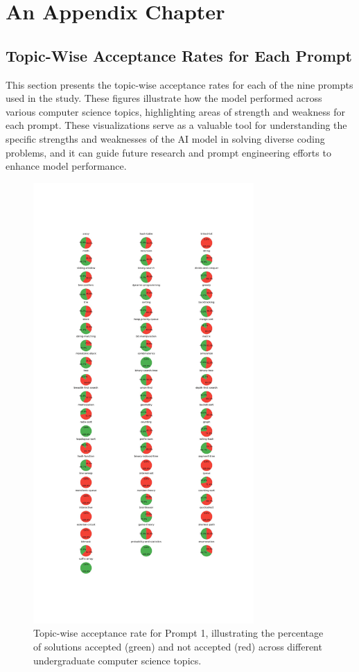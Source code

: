 \chapter{An Appendix Chapter}
\label{appn:A}

\section{Topic-Wise Acceptance Rates for Each Prompt}
This section presents the topic-wise acceptance rates for each of the nine prompts used in the study. These figures illustrate how the model performed across various computer science topics, highlighting areas of strength and weakness for each prompt. These visualizations serve as a valuable tool for understanding the specific strengths and weaknesses of the AI model in solving diverse coding problems, and it can guide future research and prompt engineering efforts to enhance model performance.

\begin{figure}[H]
    \centering
    \includegraphics[width=0.75\textwidth, height=0.7\textheight]{figures/1/accepted_not_topicwise.jpg}
    \caption{Topic-wise acceptance rate for Prompt 1, illustrating the percentage of solutions accepted (green) and not accepted (red) across different undergraduate computer science topics.}
    \label{fig:topic_wise_acceptance_prompt_1}
\end{figure}

